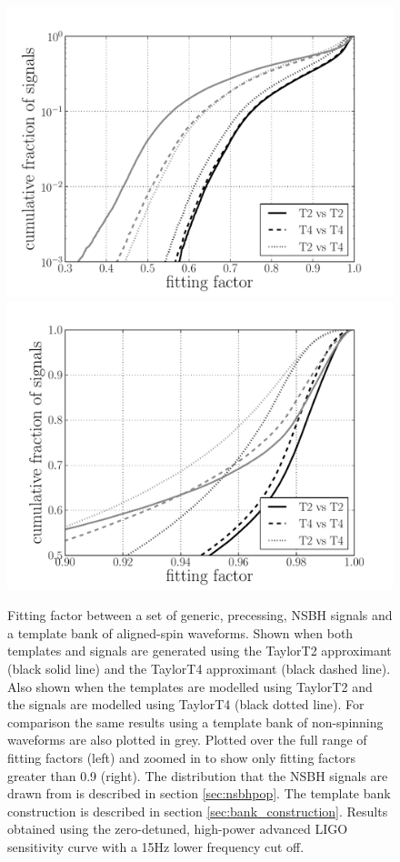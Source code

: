\begin{figure}
    \centering
    \begin{minipage}[l]{\columnwidth}
    \centering
\includegraphics[width=1.0\textwidth]
{papers/nsbh_effectualness/figure7A.pdf}
\includegraphics[width=1.0\textwidth]
{papers/nsbh_effectualness/figure7B.pdf}
\caption{\label{fig:aspineffectualness}
Fitting factor between a set of generic, precessing, NSBH signals and a
template bank of aligned-spin waveforms. Shown when both templates and signals
are generated using
the TaylorT2 approximant (black solid line) and the TaylorT4 approximant (black
dashed line).
Also shown when the templates are modelled using TaylorT2 and the signals are
modelled using TaylorT4 (black dotted line). For comparison the same results 
using a template bank of non-spinning waveforms are also plotted in grey. 
Plotted
over the full range of fitting factors (left) and zoomed in to show only
fitting factors greater than 0.9 (right). The
distribution that the NSBH signals are drawn from is described in section
\ref{sec:nsbhpop}. The template bank construction is described in section
\ref{sec:bank_construction}. Results obtained
using the zero-detuned, high-power advanced LIGO sensitivity curve with a 15Hz
lower frequency cut off.
}
\end{minipage}
\end{figure}

